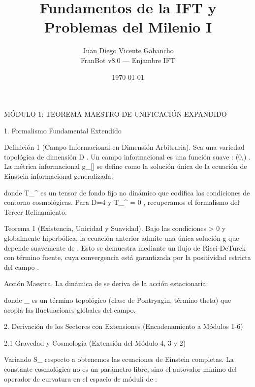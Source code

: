 \documentclass[12pt,a4paper]{book}
\title{Fundamentos de la IFT y Problemas del Milenio I}
\author{Juan Diego Vicente Gabancho \\ FranBot v8.0 — Enjambre IFT}
\date{\today}
\begin{document}
\maketitle
\tableofcontents
MÓDULO 1: TEOREMA MAESTRO DE UNIFICACIÓN EXPANDIDO

1. Formalismo Fundamental Extendido

Definición 1 (Campo Informacional en Dimensión Arbitraria). Sea    una variedad topológica de dimensión  D . Un campo informacional es una función suave  \rho :  \to (0,\infty) . La métrica informacional  g_{\mu\nu}[\rho]  se define como la solución única de la ecuación de Einstein informacional generalizada:


donde  T_{\mu\nu}^{}  es un tensor de fondo fijo no dinámico que codifica las condiciones de contorno cosmológicas. Para  D=4  y  T_{\mu\nu}^{} = 0 , recuperamos el formalismo del Tercer Refinamiento.

Teorema 1 (Existencia, Unicidad y Suavidad). Bajo las condiciones  \rho > 0  y    globalmente hiperbólica, la ecuación anterior admite una única solución  g  que depende suavemente de  \rho . Esto se demuestra mediante un flujo de Ricci-DeTurck con término fuente, cuya convergencia está garantizada por la positividad estricta del campo  \rho .

Acción Maestra. La dinámica de  \rho  se deriva de la acción estacionaria:


donde  _{}  es un término topológico (clase de Pontryagin, término theta) que acopla las fluctuaciones globales del campo.

2. Derivación de los Sectores con Extensiones (Encadenamiento a Módulos 1-6)

2.1 Gravedad y Cosmología (Extensión del Módulo 4, 3 y 2)

Variando  S_{}  respecto a  \rho  obtenemos las ecuaciones de Einstein completas. La constante cosmológica  \Lambda  no es un parámetro libre, sino el autovalor mínimo del operador de curvatura en el espacio de móduli de  \rho :
\end{document}
